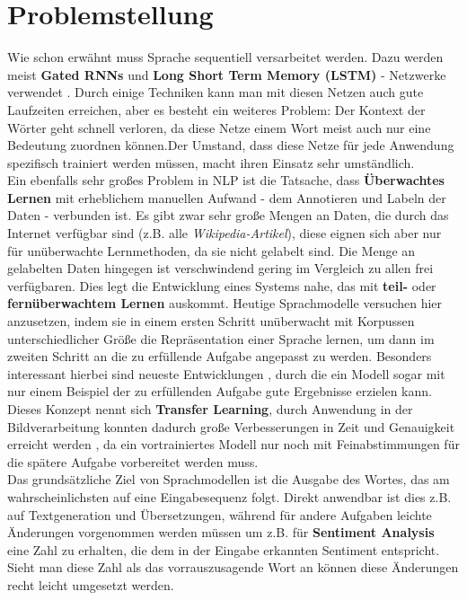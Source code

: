 \section{Problemstellung}
Wie schon erw\"ahnt muss Sprache sequentiell versarbeitet werden. Dazu werden meist \textbf{Gated RNNs} und \textbf{Long Short Term Memory (LSTM)} - Netzwerke verwendet \cite{attention}. Durch einige Techniken kann man mit diesen Netzen auch gute Laufzeiten erreichen, aber es besteht ein weiteres Problem: Der Kontext der W\"orter geht schnell verloren, da diese Netze einem Wort meist auch nur eine Bedeutung zuordnen k\"onnen.Der Umstand, dass diese Netze f\"ur jede Anwendung spezifisch trainiert werden m\"ussen, macht ihren Einsatz sehr umst\"andlich.\\
Ein ebenfalls sehr gro{\ss}es Problem in NLP ist die Tatsache, dass \textbf{\"Uberwachtes Lernen} mit erheblichem manuellen Aufwand - dem Annotieren und Labeln der Daten - verbunden ist. Es gibt zwar sehr gro{\ss}e Mengen an Daten, die durch das Internet verf\"ugbar sind (z.B. alle \textit{Wikipedia-Artikel}), diese eignen sich aber nur f\"ur un\"uberwachte Lernmethoden, da sie nicht gelabelt sind. Die Menge an gelabelten Daten hingegen ist verschwindend gering im Vergleich zu allen frei verf\"ugbaren. Dies legt die Entwicklung eines Systems nahe, das mit \textbf{teil-} oder \textbf{fern\"uberwachtem Lernen} auskommt. Heutige Sprachmodelle versuchen hier anzusetzen, indem sie in einem ersten Schritt un\"uberwacht mit Korpussen unterschiedlicher Gr\"o{\ss}e die Repr\"asentation einer Sprache lernen, um dann im zweiten Schritt an die zu erf\"ullende Aufgabe angepasst zu werden. Besonders interessant hierbei sind neueste Entwicklungen \cite{gpt3}, durch die ein Modell sogar mit nur einem Beispiel der zu erf\"ullenden Aufgabe gute Ergebnisse erzielen kann. Dieses Konzept nennt sich \textbf{Transfer Learning}, durch Anwendung in der Bildverarbeitung konnten dadurch gro{\ss}e Verbesserungen in Zeit und Genauigkeit erreicht werden \cite{ulm}, da ein vortrainiertes Modell nur noch mit Feinabstimmungen f\"ur die sp\"atere Aufgabe vorbereitet werden muss.\\
Das grunds\"atzliche Ziel von Sprachmodellen ist die Ausgabe des Wortes, das am wahrscheinlichsten auf eine Eingabesequenz folgt. Direkt anwendbar ist dies z.B. auf Textgeneration und \"Ubersetzungen, w\"ahrend f\"ur andere Aufgaben leichte \"Anderungen vorgenommen werden m\"ussen um z.B. f\"ur \textbf{Sentiment Analysis} eine Zahl zu erhalten, die dem in der Eingabe erkannten Sentiment entspricht. Sieht man diese Zahl als das vorrauszusagende Wort an k\"onnen diese \"Anderungen recht leicht umgesetzt werden.



